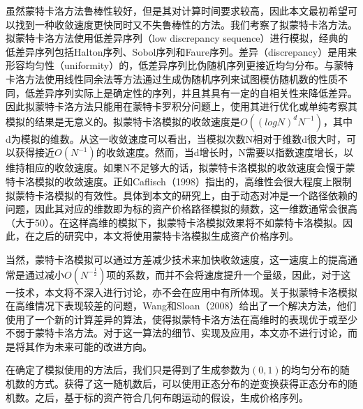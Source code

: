 虽然蒙特卡洛方法鲁棒性较好，但是其对计算时间要求较高，因此本文最初希望可以找到一种收敛速度更快同时又不失鲁棒性的方法。我们考察了拟蒙特卡洛方法。拟蒙特卡洛方法使用低差异序列（low discrepancy sequence）进行模拟，经典的低差异序列包括Halton序列、Sobol序列和Faure序列。差异（discrepancy）是用来形容均匀性（uniformity）的，低差异序列比伪随机序列更接近均匀分布。与蒙特卡洛方法使用线性同余法等方法通过生成伪随机序列来试图模仿随机数的性质不同，低差异序列实际上是确定性的序列，并且其具有一定的自相关性来降低差异。因此拟蒙特卡洛方法只能用在蒙特卡罗积分问题上，使用其进行优化或单纯考察其模拟的结果是无意义的。拟蒙特卡洛模拟的收敛速度是$O((logN)^{d}N^{-1})$，其中d为模拟的维数。从这一收敛速度可以看出，当模拟次数N相对于维数d很大时，可以获得接近$O(N^{-1})$的收敛速度。然而，当d增长时，N需要以指数速度增长，以维持相应的收敛速度。如果N不足够大的话，拟蒙特卡洛模拟的收敛速度会慢于蒙特卡洛模拟的收敛速度。正如Caflisch（1998）指出的，高维性会很大程度上限制拟蒙特卡洛模拟的有效性。具体到本文的研究上，由于动态对冲是一个路径依赖的问题，因此其对应的维数即为标的资产价格路径模拟的频数，这一维数通常会很高（大于50）。在这样高维的模拟下，拟蒙特卡洛模拟效果将不如蒙特卡洛模拟。因此，在之后的研究中，本文将使用蒙特卡洛模拟生成资产价格序列。

当然，蒙特卡洛模拟可以通过方差减少技术来加快收敛速度，这一速度上的提高通常是通过减小$O(N^{-\frac{1}{2}})$项的系数，而并不会将速度提升一个量级，因此，对于这一技术，本文将不深入进行讨论，亦不会在应用中有所体现。关于拟蒙特卡洛模拟在高维情况下表现较差的问题，Wang和Sloan（2008）给出了一个解决方法，他们使用了一个新的计算差异的算法，使得拟蒙特卡洛方法在高维时的表现优于或至少不弱于蒙特卡洛方法。对于这一算法的细节、实现及应用，本文亦不进行讨论，而是将其作为未来可能的改进方向。

在确定了模拟使用的方法后，我们只是得到了生成参数为$(0,1)$的均匀分布的随机数的方式。获得了这一随机数后，可以使用正态分布的逆变换获得正态分布的随机数。之后，基于标的资产符合几何布朗运动的假设，生成价格序列。
